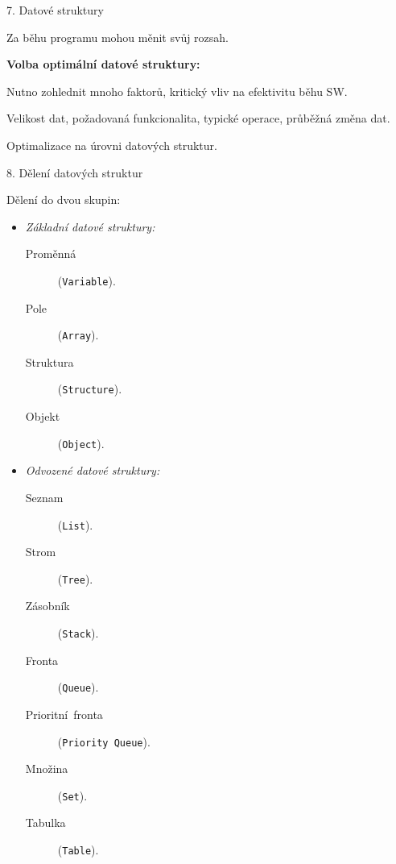 \documentclass[czech]{beamer}
\begin{document}
\begin{frame}{7. Datové struktury}
\begin{itemize}
{\scriptsize Za běhu programu mohou měnit svůj rozsah.}{\scriptsize\par}
\end{itemize}
{\scriptsize\textbf{Volba optimální datové struktury:}}{\scriptsize\par}

{\scriptsize Nutno zohlednit mnoho faktorů, kritický vliv na efektivitu
běhu SW.}{\scriptsize\par}

{\scriptsize Velikost dat, požadovaná funkcionalita, typické operace,
průběžná změna dat.}{\scriptsize\par}

{\scriptsize Optimalizace na úrovni datových struktur.}{\scriptsize\par}
\end{frame}

\begin{frame}{8. Dělení datových struktur}

Dělení do dvou skupin:\medskip{}

\begin{itemize}
\item \emph{Základní datové struktury:}

\begin{description}
\item [{Proměnná}] (\texttt{Variable}).
\item [{Pole}] (\texttt{Array}).
\item [{Struktura}] (\texttt{Structure}).
\item [{Objekt}] (\texttt{Object}).\bigskip{}
\end{description}
\item \emph{Odvozené datové struktury:}

\begin{description}
\item [{Seznam}] (\texttt{List}).
\item [{Strom}] (\texttt{Tree}).
\item [{Zásobník}] (\texttt{Stack}).
\item [{Fronta}] (\texttt{Queue}).
\item [{Prioritní~fronta}] (\texttt{Priority Queue}).
\item [{Množina}] (\texttt{Set}).
\item [{Tabulka}] (\texttt{Table}).
\end{description}
\end{itemize}

\end{frame}
\end{document}
